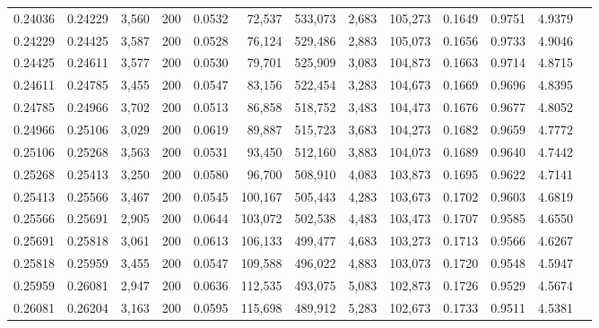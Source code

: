 \begin{tabular}{rrrrrrrrrrrrr}
0.24036 & 0.24229 & 3,560 & 200 &                                     0.0532 &  72,537 & 533,073 &   2,683 & 105,273 & 0.1649 & 0.9751 & 4.9379 \\
0.24229 & 0.24425 & 3,587 & 200 &                                     0.0528 &  76,124 & 529,486 &   2,883 & 105,073 & 0.1656 & 0.9733 & 4.9046 \\
0.24425 & 0.24611 & 3,577 & 200 &                                     0.0530 &  79,701 & 525,909 &   3,083 & 104,873 & 0.1663 & 0.9714 & 4.8715 \\
0.24611 & 0.24785 & 3,455 & 200 &                                     0.0547 &  83,156 & 522,454 &   3,283 & 104,673 & 0.1669 & 0.9696 & 4.8395 \\
0.24785 & 0.24966 & 3,702 & 200 &                                     0.0513 &  86,858 & 518,752 &   3,483 & 104,473 & 0.1676 & 0.9677 & 4.8052 \\
0.24966 & 0.25106 & 3,029 & 200 &                                     0.0619 &  89,887 & 515,723 &   3,683 & 104,273 & 0.1682 & 0.9659 & 4.7772 \\
0.25106 & 0.25268 & 3,563 & 200 &                                     0.0531 &  93,450 & 512,160 &   3,883 & 104,073 & 0.1689 & 0.9640 & 4.7442 \\
0.25268 & 0.25413 & 3,250 & 200 &                                     0.0580 &  96,700 & 508,910 &   4,083 & 103,873 & 0.1695 & 0.9622 & 4.7141 \\
0.25413 & 0.25566 & 3,467 & 200 &                                     0.0545 & 100,167 & 505,443 &   4,283 & 103,673 & 0.1702 & 0.9603 & 4.6819 \\
0.25566 & 0.25691 & 2,905 & 200 &                                     0.0644 & 103,072 & 502,538 &   4,483 & 103,473 & 0.1707 & 0.9585 & 4.6550 \\
0.25691 & 0.25818 & 3,061 & 200 &                                     0.0613 & 106,133 & 499,477 &   4,683 & 103,273 & 0.1713 & 0.9566 & 4.6267 \\
0.25818 & 0.25959 & 3,455 & 200 &                                     0.0547 & 109,588 & 496,022 &   4,883 & 103,073 & 0.1720 & 0.9548 & 4.5947 \\
0.25959 & 0.26081 & 2,947 & 200 &                                     0.0636 & 112,535 & 493,075 &   5,083 & 102,873 & 0.1726 & 0.9529 & 4.5674 \\
0.26081 & 0.26204 & 3,163 & 200 &                                     0.0595 & 115,698 & 489,912 &   5,283 & 102,673 & 0.1733 & 0.9511 & 4.5381 \\

\end{tabular}
